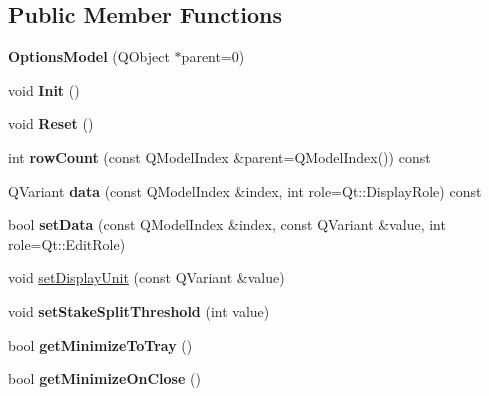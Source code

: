 \subsection*{Public Member Functions}
\begin{DoxyCompactItemize}
\item 
\mbox{\label{class_options_model_a17c6b3de70c415b0fdf5c27f5f871054}} 
{\bfseries Options\+Model} (Q\+Object $\ast$parent=0)
\item 
\mbox{\label{class_options_model_a0e02c341067bff7be262fede017fbea0}} 
void {\bfseries Init} ()
\item 
\mbox{\label{class_options_model_ab952b1946cf3a4c76706ec796a3e629b}} 
void {\bfseries Reset} ()
\item 
\mbox{\label{class_options_model_ac9901d7d28c3362678539fc3b88d0aba}} 
int {\bfseries row\+Count} (const Q\+Model\+Index \&parent=Q\+Model\+Index()) const
\item 
\mbox{\label{class_options_model_abcd96450560150ec71b13958e7d11d47}} 
Q\+Variant {\bfseries data} (const Q\+Model\+Index \&index, int role=Qt\+::\+Display\+Role) const
\item 
\mbox{\label{class_options_model_a3102b457f4d46efac8ecb03b3d536b62}} 
bool {\bfseries set\+Data} (const Q\+Model\+Index \&index, const Q\+Variant \&value, int role=Qt\+::\+Edit\+Role)
\item 
void \mbox{\hyperlink{class_options_model_a42efacc748130848acc20247a7ed4617}{set\+Display\+Unit}} (const Q\+Variant \&value)
\item 
\mbox{\label{class_options_model_aebde6a561a47cdc14410f35076a86b28}} 
void {\bfseries set\+Stake\+Split\+Threshold} (int value)
\item 
\mbox{\label{class_options_model_af026ad3b0705de76c1f57d9a6132aec0}} 
bool {\bfseries get\+Minimize\+To\+Tray} ()
\item 
\mbox{\label{class_options_model_a82cd711817f3c9c87efbfa71b5ae0629}} 
bool {\bfseries get\+Minimize\+On\+Close} ()

\end{DoxyCompactItemize}
